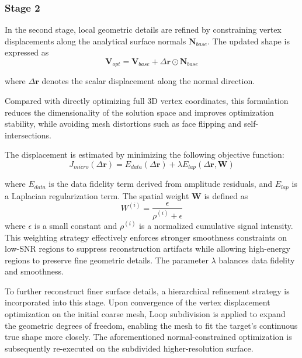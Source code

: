 \documentclass[conference]{IEEEtran}
\begin{document}
\subsubsection{Stage 2}

In the second stage, local geometric details are refined by constraining vertex displacements along the analytical surface normals $\mathbf{N}_{base}$. The updated shape is expressed as
\begin{equation}
	\mathbf{V}_{opt} = \mathbf{V}_{base} + \Delta \mathbf{r} \odot \mathbf{N}_{base}
\end{equation}

where $\Delta \mathbf{r}$ denotes the scalar displacement along the normal direction.

Compared with directly optimizing full 3D vertex coordinates, this formulation reduces the dimensionality of the solution space and improves optimization stability, while avoiding mesh distortions such as face flipping and self-intersections.

The displacement is estimated by minimizing the following objective function:
\begin{equation}
	J_{micro}(\Delta \mathbf{r}) = E_{data}(\Delta \mathbf{r}) + \lambda E_{lap}(\Delta \mathbf{r}, \mathbf{W})
\end{equation}

where $E_{data}$ is the data fidelity term derived from amplitude residuals, and $E_{lap}$ is a Laplacian regularization term. The spatial weight $\mathbf{W}$ is defined as
\begin{equation}
	W^{(i)} = \frac{\epsilon}{\rho^{(i)} + \epsilon}
\end{equation}
where $\epsilon$ is a small constant and $\rho^{(i)}$ is a normalized cumulative signal intensity. This weighting strategy effectively enforces stronger smoothness constraints on low-SNR regions to suppress reconstruction artifacts while allowing high-energy regions to preserve fine geometric details. The parameter $\lambda$ balances data fidelity and smoothness.

To further reconstruct finer surface details, a hierarchical refinement strategy is incorporated into this stage. Upon convergence of the vertex displacement optimization on the initial coarse mesh, Loop subdivision is applied to expand the geometric degrees of freedom, enabling the mesh to fit the target's continuous true shape more closely. The aforementioned normal-constrained optimization is subsequently re-executed on the subdivided higher-resolution surface.
\end{document}
